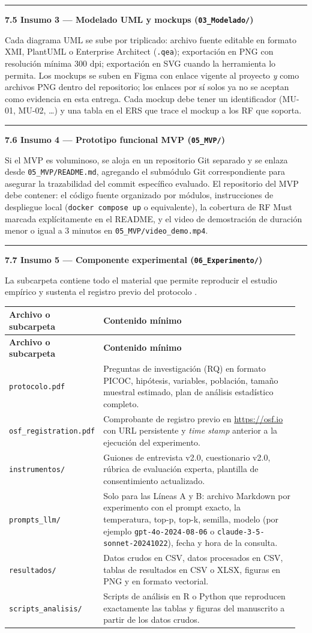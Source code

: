 \documentclass[11pt,a4paper]{article}
\newcommand{\submark}[1]{\par\vspace{4pt}\noindent
    {\color{uteqgreen}\rule[-1pt]{3.5pt}{12pt}}\hspace{6pt}\textbf{\color{uteqgreen}#1}\par\vspace{2pt}}
\newcommand{\hh}[1]{\cellcolor{uteqgreen}\textbf{\color{white}\small #1}}
\begin{document}
\submark{7.5 Insumo 3 --- Modelado UML y mockups (\texttt{03\_Modelado/})}
Cada diagrama UML se sube por triplicado: archivo fuente editable en formato XMI, PlantUML o Enterprise Architect (\texttt{.qea}); exportación en PNG con resolución mínima 300 dpi; exportación en SVG cuando la herramienta lo permita.
Los mockups se suben en Figma con enlace vigente al proyecto \emph{y} como archivos PNG dentro del repositorio; los enlaces por sí solos ya no se aceptan como evidencia en esta entrega.
Cada mockup debe tener un identificador (MU-01, MU-02, \ldots) y una tabla en el ERS que trace el mockup a los RF que soporta.

\submark{7.6 Insumo 4 --- Prototipo funcional MVP (\texttt{05\_MVP/})}
Si el MVP es voluminoso, se aloja en un repositorio Git separado y se enlaza desde \texttt{05\_MVP/README.md}, agregando el submódulo Git correspondiente para asegurar la trazabilidad del commit específico evaluado.
El repositorio del MVP debe contener: el código fuente organizado por módulos, instrucciones de despliegue local (\texttt{docker compose up} o equivalente), la cobertura de RF Must marcada explícitamente en el README, y el video de demostración de duración menor o igual a 3 minutos en \texttt{05\_MVP/video\_demo.mp4}.

\submark{7.7 Insumo 5 --- Componente experimental (\texttt{06\_Experimento/})}
La subcarpeta contiene todo el material que permite reproducir el estudio empírico y sustenta el registro previo del protocolo \cite{nosek2018preregistration}.

\begin{longtable}{@{}L{0.28\linewidth} L{0.68\linewidth}@{}}
    \hh{Archivo o subcarpeta} & \hh{Contenido mínimo}\\
    \endfirsthead
    \hh{Archivo o subcarpeta} & \hh{Contenido mínimo}\\
    \endhead
    \texttt{protocolo.pdf} & Preguntas de investigación (RQ) en formato PICOC, hipótesis, variables, población, tamaño muestral estimado, plan de análisis estadístico completo.\\
    \texttt{osf\_registration.pdf} & Comprobante de registro previo en \url{https://osf.io} con URL persistente y \emph{time stamp} anterior a la ejecución del experimento.\\
    \texttt{instrumentos/} & Guiones de entrevista v2.0, cuestionario v2.0, rúbrica de evaluación experta, plantilla de consentimiento actualizado.\\
    \texttt{prompts\_llm/} & Solo para las Líneas A y B: archivo Markdown por experimento con el prompt exacto, la temperatura, top-p, top-k, semilla, modelo (por ejemplo \texttt{gpt-4o-2024-08-06} o \texttt{claude-3-5-sonnet-20241022}), fecha y hora de la consulta.\\
    \texttt{resultados/} & Datos crudos en CSV, datos procesados en CSV, tablas de resultados en CSV o XLSX, figuras en PNG y en formato vectorial.\\
    \texttt{scripts\_analisis/} & Scripts de análisis en R o Python que reproducen exactamente las tablas y figuras del manuscrito a partir de los datos crudos.\\
\end{longtable}
\end{document}
